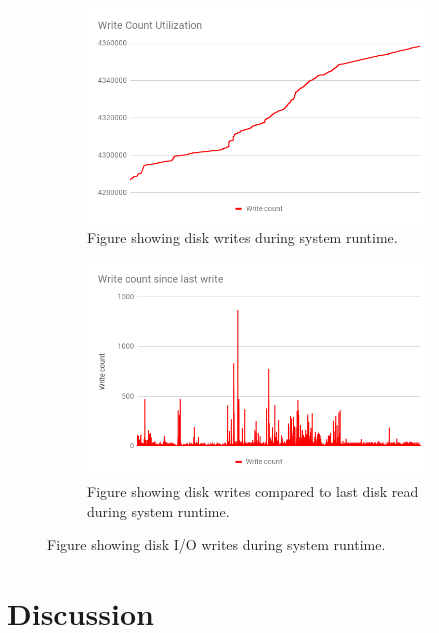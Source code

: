 \documentclass[USenglish]{uit-thesis}
\begin{document}
\begin{figure}
\centering
\begin{subfigure}[b]{1\textwidth}
   \includegraphics[width=1\textwidth]{chart_write_count.png}
   \caption{Figure showing disk writes during system runtime.}
   \label{fig:chart_write_count} 
\end{subfigure}

\begin{subfigure}[b]{1\textwidth}
   \includegraphics[width=1\textwidth]{chart_write_count_since_last.png}
   \caption{Figure showing disk writes compared to last disk read during system runtime.}
   \label{fig:chart_write_count_since_last}
\end{subfigure}

\caption{Figure showing disk I/O writes during system runtime.}
\label{fig:write_disk}
\end{figure}


\chapter{Discussion}
\end{document}
